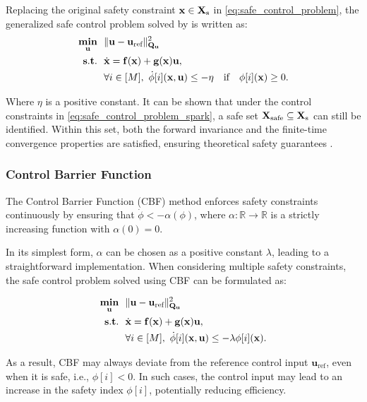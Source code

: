 Replacing the original safety constraint $\mathbf{x} \in \mathbf{X}_\mathrm{s}$ in \eqref{eq:safe_control_problem}, the generalized safe control problem solved by \spark is written as:  
\begin{align}\label{eq:safe_control_problem_spark}
    \mathop{\mathbf{min}}_{\mathbf{u}}~~ & \|\mathbf{u} - \mathbf{u}_{\text{ref}} \|^2_{\mathbf{Q}_\mathbf{u}} \\ \nonumber
    \mathop{\mathbf{s.t.}}~~ & \dot{\mathbf{x}} = \mathbf{f}(\mathbf{x}) + \mathbf{g}(\mathbf{x})\mathbf{u}, \\ \nonumber
    & \forall i \in [M],~ \dot{\phi}[i](\mathbf{x}, \mathbf{u}) \leq -\eta \quad \text{if} \quad \phi[i](\mathbf{x}) \geq 0.
\end{align}  

Where $\eta$ is a positive constant. It can be shown that under the control constraints in \eqref{eq:safe_control_problem_spark}, a safe set $\mathbf{X}_\mathrm{safe} \subseteq \mathbf{X}_\mathrm{s}$ can still be identified. Within this set, both the forward invariance and the finite-time convergence properties are satisfied, ensuring theoretical safety guarantees \cite{chen2023safetyindexsynthesisstatedependent}.


\subsubsection{Control Barrier Function}

The Control Barrier Function (CBF) method \cite{ames2019control} enforces safety constraints continuously by ensuring that  $\dot{\phi} < -\alpha(\phi)$,
where $\alpha: \mathbb{R} \to \mathbb{R}$ is a strictly increasing function with $\alpha(0) = 0$.  

In its simplest form, $\alpha$ can be chosen as a positive constant $\lambda$, leading to a straightforward implementation. When considering multiple safety constraints, the safe control problem solved using CBF can be formulated as:

\begin{align}\label{eq:safe_control_problem_cbf}
    \mathop{\mathbf{min}}_{\mathbf{u}}~~ & \|\mathbf{u} - \mathbf{u}_{\text{ref}} \|^2_{\mathbf{Q}_\mathbf{u}} \\ \nonumber
    \mathop{\mathbf{s.t.}}~~ & \dot{\mathbf{x}} = \mathbf{f}(\mathbf{x}) + \mathbf{g}(\mathbf{x})\mathbf{u}, \\ \nonumber
    & \forall i \in [M],~ \dot{\phi}[i](\mathbf{x}, \mathbf{u}) \leq -\lambda \phi[i](\mathbf{x}).
\end{align}  

As a result, CBF may always deviate from the reference control input $\mathbf{u}_{\text{ref}}$, even when it is safe, i.e., $\phi[i] < 0$. In such cases, the control input may lead to an increase in the safety index $\phi[i]$, potentially reducing efficiency.  

